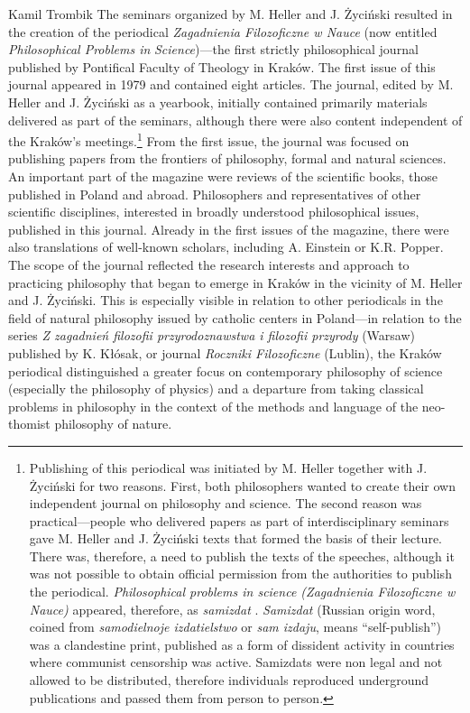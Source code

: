 \begin{artengenv}{Kamil Trombik}
The seminars organized by M. Heller and J. Życiński resulted in the creation of the periodical \textit{Zagadnienia
Filozoficzne w Nauce} (now entitled \textit{Philosophical Problems in }\textit{Science})---the first strictly
philosophical journal published by Pontifical Faculty of Theology in Kraków. The first issue of this journal appeared
in 1979 and contained eight articles. The journal, edited by M. Heller and J. Życiński as a yearbook, initially
contained primarily materials delivered as part of the seminars, although there were also content independent of the
Kraków's meetings.\footnote{Publishing of this periodical was initiated by M. Heller together with J. Życiński for two
reasons. First, both philosophers wanted to create their own independent journal on philosophy and science. The second
reason was practical---people who delivered papers as part of interdisciplinary seminars gave M. Heller and J. Życiński
texts that formed the basis of their lecture. There was, therefore, a need to publish the texts of the speeches,
although it was not possible to obtain official permission from the authorities to publish the periodical.
\textit{Philosophical problems in science (Zagadnienia Filozoficzne w Nauce)} appeared, therefore, as \textit{samizdat}
\parencite{heller_interview_2017}.
\textit{Samizdat} (Russian origin word, coined from \textit{samodielnoje
izdatielstwo} or \textit{sam izdaju}, means ``self-publish'') was a clandestine print, published as a form of dissident
activity in countries where communist censorship was active. Samizdats were non legal and not allowed to be
distributed, therefore individuals reproduced underground publications and passed them from person to person. } From
the first issue, the journal was focused on publishing papers from the frontiers of philosophy, formal and natural
sciences. An important part of the magazine were reviews of the scientific books, those published in Poland and abroad.
Philosophers and representatives of other scientific disciplines, interested in broadly understood philosophical
issues, published in this journal. Already in the first issues of the magazine, there were also translations of
well-known scholars, including A. Einstein or K.R. Popper. The scope of the journal reflected the research interests
and approach to practicing philosophy that began to emerge in Kraków in the vicinity of M. Heller and J. Życiński. This
is especially visible in relation to other periodicals in the field of natural philosophy issued by catholic centers in
Poland---in relation to the series \textit{Z zagadnień filozofii przyrodoznawstwa i filozofii przyrody} (Warsaw)
published by K. Kłósak, or journal \textit{Roczniki Filozoficzne }(Lublin), the Kraków periodical distinguished a
greater focus on contemporary philosophy of science (especially the philosophy of physics) and a departure from taking
classical problems in philosophy in the context of the methods and language of the neo-thomist philosophy of nature.


\end{artengenv}
